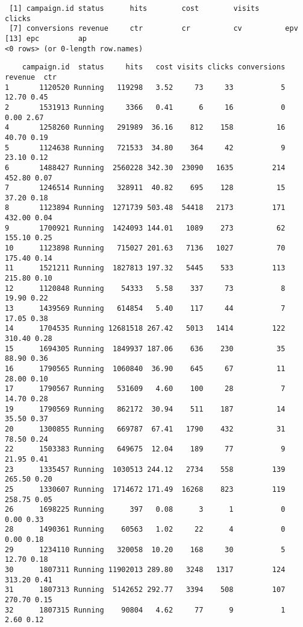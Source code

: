 \documentclass[
]{article}
\begin{document}
\begin{verbatim}
 [1] campaign.id status      hits        cost        visits      clicks     
 [7] conversions revenue     ctr         cr          cv          epv        
[13] epc         ap         
<0 rows> (or 0-length row.names)
\end{verbatim}

\begin{verbatim}
    campaign.id  status     hits   cost visits clicks conversions revenue  ctr
1       1120520 Running   119298   3.52     73     33           5   12.70 0.45
2       1531913 Running     3366   0.41      6     16           0    0.00 2.67
4       1258260 Running   291989  36.16    812    158          16   40.70 0.19
5       1124638 Running   721533  34.80    364     42           9   23.10 0.12
6       1488427 Running  2560228 342.30  23090   1635         214  452.80 0.07
7       1246514 Running   328911  40.82    695    128          15   37.20 0.18
8       1123894 Running  1271739 503.48  54418   2173         171  432.00 0.04
9       1700921 Running  1424093 144.01   1089    273          62  155.10 0.25
10      1123898 Running   715027 201.63   7136   1027          70  175.40 0.14
11      1521211 Running  1827813 197.32   5445    533         113  215.80 0.10
12      1120848 Running    54333   5.58    337     73           8   19.90 0.22
13      1439569 Running   614854   5.40    117     44           7   17.05 0.38
14      1704535 Running 12681518 267.42   5013   1414         122  310.40 0.28
15      1694305 Running  1849937 187.06    636    230          35   88.90 0.36
16      1790565 Running  1060840  36.90    645     67          11   28.00 0.10
17      1790567 Running   531609   4.60    100     28           7   14.70 0.28
19      1790569 Running   862172  30.94    511    187          14   35.50 0.37
20      1300855 Running   669787  67.41   1790    432          31   78.50 0.24
22      1503383 Running   649675  12.04    189     77           9   21.95 0.41
23      1335457 Running  1030513 244.12   2734    558         139  265.50 0.20
25      1330607 Running  1714672 171.49  16268    823         119  258.75 0.05
26      1698225 Running      397   0.08      3      1           0    0.00 0.33
28      1490361 Running    60563   1.02     22      4           0    0.00 0.18
29      1234110 Running   320058  10.20    168     30           5   12.70 0.18
30      1807311 Running 11902013 289.80   3248   1317         124  313.20 0.41
31      1807313 Running  5142652 292.77   3394    508         107  270.70 0.15
32      1807315 Running    90804   4.62     77      9           1    2.60 0.12

\end{verbatim}
\end{document}
